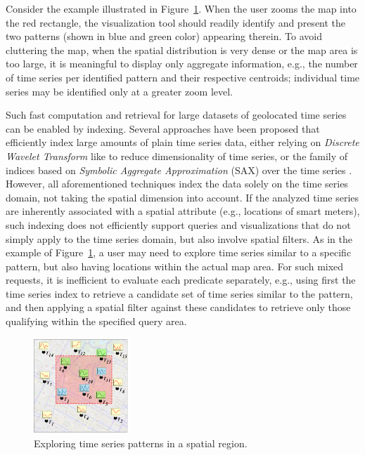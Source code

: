 Consider the example illustrated in Figure~\ref{fig:map}. When the user zooms the map into the red rectangle, the visualization tool should readily identify and present the two patterns (shown in blue and green color) appearing therein. To avoid cluttering the map, when the spatial distribution is very dense or the map area is too large, it is meaningful to display only aggregate information, e.g., the number of time series per identified pattern and their respective centroids; individual time series may be identified only at a greater zoom level.

Such fast computation and retrieval for large datasets of geolocated time series can be enabled by indexing. Several approaches have been proposed that efficiently index large amounts of plain time series data, either relying on \emph{Discrete Wavelet Transform} like \cite{chan1999icde} to reduce dimensionality of time series, or the family of indices based on \emph{Symbolic Aggregate Approximation} (SAX) over the time series \cite{shieh2008kdd,camerra2010icdm,camerra2014kais,zoumpatianos2014sigmod}. However, all aforementioned techniques index the data solely on the time series domain, not taking the spatial dimension into account. If the analyzed time series are inherently associated with a spatial attribute (e.g., locations of smart meters), such indexing does not efficiently support queries and visualizations that do not simply apply to the time series domain, but also involve spatial filters. As in the example of Figure~\ref{fig:map}, a user may need to explore time series similar to a specific pattern, but also having locations within the actual map area. For such mixed requests, it is inefficient to evaluate each predicate separately, e.g., using first the time series index to retrieve a candidate set of time series similar to the pattern, and then applying a spatial filter against these candidates to retrieve only those qualifying within the specified query area. 

\begin{figure}[t]
\includegraphics[width=0.32\textwidth]{figures/map.png}
\vspace{-5pt}
\caption{Exploring time series patterns in a spatial region.}
\vspace{-15pt}
\label{fig:map}
\end{figure}

